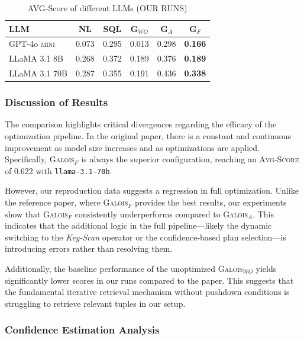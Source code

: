 \begin{table}[H]
    \centering
    \caption{AVG-Score of different LLMs (OUR RUNS)}
    \begin{tabular}{lccccc}
        \toprule
        \textbf{LLM} & \textbf{NL} & \textbf{SQL} & \textbf{G$_{WO}$} & \textbf{G$_{A}$} & \textbf{G$_{F}$} \\
        \midrule
        GPT-4o \textsc{mini} & 0.073 & 0.295 & 0.013 & 0.298 & \textbf{0.166} \\
        LLaMA 3.1 8B & 0.268 & 0.372 & 0.189 & 0.376 & \textbf{0.189} \\
        LLaMA 3.1 70B & 0.287 & 0.355 & 0.191 & 0.436 & \textbf{0.338} \\
        \bottomrule
    \end{tabular}
\end{table}

\subsubsection{Discussion of Results}
The comparison highlights critical divergences regarding the efficacy of the optimization pipeline. In the original paper, there is a constant and continuous improvement as model size increases and as optimizations are applied. Specifically, \textsc{Galois}$_{F}$ is always the superior configuration, reaching an \textsc{Avg-Score} of 0.622 with \texttt{llama-3.1-70b}.

However, our reproduction data suggests a regression in full optimization. Unlike the reference paper, where \textsc{Galois}$_{F}$ provides the best results, our experiments show that \textsc{Galois}$_{F}$ consistently underperforms compared to \textsc{Galois}$_{A}$. This indicates that the additional logic in the full pipeline—likely the dynamic switching to the \textit{Key-Scan} operator or the confidence-based plan selection—is introducing errors rather than resolving them. 

Additionally, the baseline performance of the unoptimized \textsc{Galois}$_{WO}$ yields significantly lower scores in our runs compared to the paper. This suggests that the fundamental iterative retrieval mechanism without pushdown conditions is struggling to retrieve relevant tuples in our setup.

\subsubsection{Confidence Estimation Analysis}

